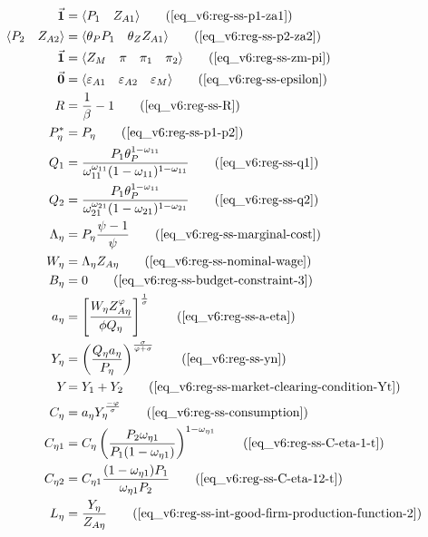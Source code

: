 \documentclass[../thesis.tex]{subfiles}
\begin{document}
	\begin{align}
		\vec{\bm{1}} &= \langle \begin{matrix} P_{1} & Z_{A1} \end{matrix} \rangle \tag{\ref{eq_v6:reg-ss-p1-za1}}
		\\ 
		\langle \begin{matrix} P_{2} & Z_{A2} \end{matrix} \rangle &= \langle \begin{matrix} \theta_{P} P_{1} & \theta_{Z} Z_{A1} \end{matrix} \rangle \tag{\ref{eq_v6:reg-ss-p2-za2}}
		\\
		\vec{\bm{1}} &= \langle \begin{matrix} Z_{M} & \pi & \pi_{1} & \pi_{2} \end{matrix} \rangle \tag{\ref{eq_v6:reg-ss-zm-pi}}
		\\
		\vec{\bm{0}} &= \langle \begin{matrix} \varepsilon_{A1} & \varepsilon_{A2} & \varepsilon_{M} \end{matrix} \rangle \tag{\ref{eq_v6:reg-ss-epsilon}}
		\\
		R &= \frac{1}{\beta} - 1 \tag{\ref{eq_v6:reg-ss-R}}
		\\
		P_{\eta}^{\ast} &= P_{\eta} \tag{\ref{eq_v6:reg-ss-p1-p2}} 
		\\
		Q_{1} &= \frac{P_{1} \theta_{P}^{1 - \omega_{11}}}{\omega_{11}^{\omega_{11}} (1 - \omega_{11})^{1 - \omega_{11}}} \tag{\ref{eq_v6:reg-ss-q1}} 
		\\
		Q_{2} &= \frac{P_{1} \theta_{P}^{1 - \omega_{11}}}{\omega_{21}^{\omega_{21}} (1 - \omega_{21})^{1 - \omega_{21}}} \tag{\ref{eq_v6:reg-ss-q2}} 
		\\
		\Lambda_{\eta} &= P_{\eta} \frac{\psi-1}{\psi} \tag{\ref{eq_v6:reg-ss-marginal-cost}} 
		\\
		W_{\eta} &= \Lambda_{\eta} Z_{A\eta} \tag{\ref{eq_v6:reg-ss-nominal-wage}} 
		\\
		B_{\eta} &= 0 \tag{\ref{eq_v6:reg-ss-budget-constraint-3}} 
		\\
		a_{\eta} &= \left[ \frac{W_{\eta} Z_{A\eta}^{\varphi}}{\phi  Q_{\eta}} \right]^{\frac{1}{\sigma}} \tag{\ref{eq_v6:reg-ss-a-eta}} 
		\\
		Y_{\eta} &= \left( \frac{Q_{\eta} a_{\eta}}{P_{\eta}} \right)^{\frac{\sigma}{\varphi + \sigma}} \tag{\ref{eq_v6:reg-ss-yn}} 
		\\
		Y_{} &= Y_{1} + Y_{2} \tag{\ref{eq_v6:reg-ss-market-clearing-condition-Yt}} 
		\\
		C_{\eta} &= a_{\eta} Y_{\eta}^{\frac{-\varphi}{\sigma}} \tag{\ref{eq_v6:reg-ss-consumption}} 
		\\
		C_{\eta 1} &= C_{\eta} \left( \frac{P_{2} \omega_{\eta 1}}{P_{1} (1 - \omega_{\eta 1})} \right)^{1-\omega_{\eta 1}} \tag{\ref{eq_v6:reg-ss-C-eta-1-t}} 
		\\
		C_{\eta 2} &= C_{\eta 1} \frac{(1 - \omega_{\eta 1}) P_{1}}{\omega_{\eta 1} P_{2}} \tag{\ref{eq_v6:reg-ss-C-eta-12-t}} 
		\\
		L_{\eta} &= \frac{Y_{\eta}}{Z_{A\eta}} \tag{\ref{eq_v6:reg-ss-int-good-firm-production-function-2}}
	\end{align}
\end{document}
